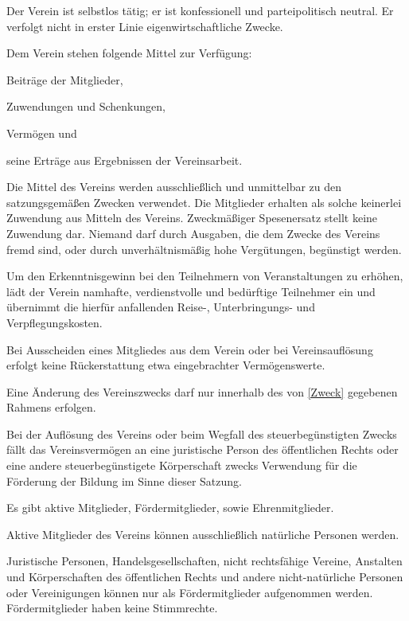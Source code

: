 \documentclass[draft]{scrartcl}
\begin{document}
\begin{contract}
Der Verein ist selbstlos tätig; er ist konfessionell und parteipolitisch
neutral. Er verfolgt nicht in erster Linie eigenwirtschaftliche Zwecke.

Dem Verein stehen folgende Mittel zur Verfügung:

\begin{compactitem}
  \item Beiträge der Mitglieder,
  \item Zuwendungen und Schenkungen,
  \item Vermögen und
  \item seine Erträge aus Ergebnissen der Vereinsarbeit.
\end{compactitem}

Die Mittel des Vereins werden ausschließlich und unmittelbar zu den
satzungsgemäßen Zwecken verwendet. Die Mitglieder erhalten als solche
keinerlei Zuwendung aus Mitteln des Vereins. Zweckmäßiger Spesenersatz stellt
keine Zuwendung dar. Niemand darf durch Ausgaben, die dem Zwecke des Vereins
fremd sind, oder durch unverhältnismäßig hohe Vergütungen, begünstigt werden.

Um den Erkenntnisgewinn bei den Teilnehmern von Veranstaltungen zu erhöhen,
lädt der Verein namhafte, verdienstvolle und bedürftige Teilnehmer ein und
übernimmt die hierfür anfallenden Reise-, Unterbringungs- und
Verpflegungskosten.

Bei Ausscheiden eines Mitgliedes aus dem Verein oder bei Vereinsauf\/lösung
erfolgt keine Rückerstattung etwa eingebrachter Vermögenswerte.

Eine Änderung des Vereinszwecks darf nur innerhalb des von \ref{Zweck}
gegebenen Rahmens erfolgen.

Bei der Auf\/lösung des Vereins oder beim Wegfall des steuerbegünstigten
Zwecks fällt das Vereinsvermögen an eine juristische Person des öffentlichen
Rechts oder eine andere steuerbegünstigete Körperschaft zwecks Verwendung
für die Förderung der Bildung im Sinne dieser Satzung.


Es gibt aktive Mitglieder, Fördermitglieder, sowie Ehrenmitglieder.

Aktive Mitglieder des Vereins können ausschließlich natürliche Personen
werden.

Juristische Personen, Handelsgesellschaften, nicht rechtsfähige Vereine,
Anstalten und Kör\-pers\-chaften des öff\-ent\-lich\-en Rechts und andere
nicht-natürliche Personen oder Vereinigungen können nur als Fördermitglieder
aufgenommen werden. Fördermitglieder haben keine Stimmrechte.


\end{contract}
\end{document}

